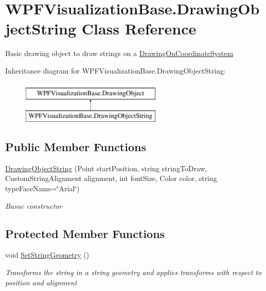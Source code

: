 \hypertarget{class_w_p_f_visualization_base_1_1_drawing_object_string}{}\section{W\+P\+F\+Visualization\+Base.\+Drawing\+Object\+String Class Reference}
\label{class_w_p_f_visualization_base_1_1_drawing_object_string}


Basic drawing object to draw strings on a \hyperlink{class_w_p_f_visualization_base_1_1_drawing_on_coordinate_system}{Drawing\+On\+Coordinate\+System}  


Inheritance diagram for W\+P\+F\+Visualization\+Base.\+Drawing\+Object\+String\+:\begin{figure}[H]
\begin{center}
\leavevmode
\includegraphics[height=2.000000cm]{class_w_p_f_visualization_base_1_1_drawing_object_string}
\end{center}
\end{figure}
\subsection*{Public Member Functions}
\begin{DoxyCompactItemize}
\item 
\hyperlink{class_w_p_f_visualization_base_1_1_drawing_object_string_ad0bb7819f4964d443c739088592684aa}{Drawing\+Object\+String} (Point start\+Position, string string\+To\+Draw, Custom\+String\+Alignment alignment, int font\+Size, Color color, string type\+Face\+Name=\char`\"{}Arial\char`\"{})
\begin{DoxyCompactList}\small\item\em Basuc constructor \end{DoxyCompactList}\end{DoxyCompactItemize}
\subsection*{Protected Member Functions}
\begin{DoxyCompactItemize}
\item 
void \hyperlink{class_w_p_f_visualization_base_1_1_drawing_object_string_a1e94d5001e4a4d7019569509d5e7899e}{Set\+String\+Geometry} ()
\begin{DoxyCompactList}\small\item\em Transforms the string in a string geometry and applies transforms with respect to position and alignment \end{DoxyCompactList}\end{DoxyCompactItemize}
